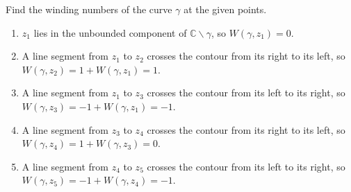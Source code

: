 \documentclass{article}
\newcounter{Problem}
\newenvironment{Problem}{\begin{Exercise}[name={Problem},
                                          counter={Problem}]}
                        {\end{Exercise}}
\begin{document}
\begin{Problem}
Find the winding numbers of the curve $\gamma$ at the given points.
\end{Problem}

\begin{Answer}
\begin{enumerate}
  \item{
    $z_1$ lies in the unbounded component of
    $\mathbb{C} \backslash \gamma$, so $W(\gamma, z_1) = 0$.
  }
  \item{
    A line segment from $z_1$ to $z_2$ crosses the contour from its
    right to its left, so $W(\gamma, z_2) = 1 + W(\gamma, z_1) = 1$.
  }
  \item{
    A line segment from $z_1$ to $z_3$ crosses the contour from its
    left to its right, so $W(\gamma, z_3) = -1 + W(\gamma, z_1) = -1$.
  }
  \item{
    A line segment from $z_3$ to $z_4$ crosses the contour from its
    right to its left, so $W(\gamma, z_4) = 1 + W(\gamma, z_3) = 0$.
  }
  \item{
    A line segment from $z_4$ to $z_5$ crosses the contour from its
    left to its right, so $W(\gamma, z_5) = -1 + W(\gamma, z_4) = -1$.
  }
\end{enumerate}
\end{Answer}
\end{document}

